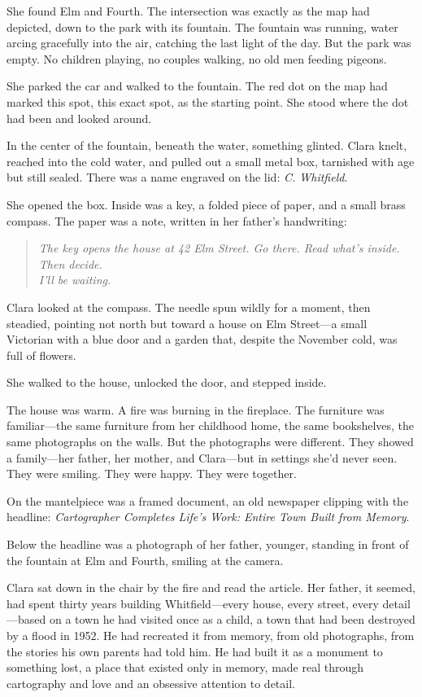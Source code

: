 \documentclass[
    language=english,
    doctype=short-story,
    institution=none,
]{../../omnilatex}
\begin{document}
She found Elm and Fourth. The intersection was exactly as the map had depicted, down to the park with its fountain. The fountain was running, water arcing gracefully into the air, catching the last light of the day. But the park was empty. No children playing, no couples walking, no old men feeding pigeons.

She parked the car and walked to the fountain. The red dot on the map had marked this spot, this exact spot, as the starting point. She stood where the dot had been and looked around.

In the center of the fountain, beneath the water, something glinted. Clara knelt, reached into the cold water, and pulled out a small metal box, tarnished with age but still sealed. There was a name engraved on the lid: \textit{C. Whitfield}.

She opened the box. Inside was a key, a folded piece of paper, and a small brass compass. The paper was a note, written in her father's handwriting:

\begin{quote}
\textit{The key opens the house at 42 Elm Street. Go there. Read what's inside. Then decide.}\\[0.3cm]
\textit{I'll be waiting.}
\end{quote}

Clara looked at the compass. The needle spun wildly for a moment, then steadied, pointing not north but toward a house on Elm Street---a small Victorian with a blue door and a garden that, despite the November cold, was full of flowers.

She walked to the house, unlocked the door, and stepped inside.

The house was warm. A fire was burning in the fireplace. The furniture was familiar---the same furniture from her childhood home, the same bookshelves, the same photographs on the walls. But the photographs were different. They showed a family---her father, her mother, and Clara---but in settings she'd never seen. They were smiling. They were happy. They were together.

On the mantelpiece was a framed document, an old newspaper clipping with the headline: \textit{Cartographer Completes Life's Work: Entire Town Built from Memory}.

Below the headline was a photograph of her father, younger, standing in front of the fountain at Elm and Fourth, smiling at the camera.

Clara sat down in the chair by the fire and read the article. Her father, it seemed, had spent thirty years building Whitfield---every house, every street, every detail---based on a town he had visited once as a child, a town that had been destroyed by a flood in 1952. He had recreated it from memory, from old photographs, from the stories his own parents had told him. He had built it as a monument to something lost, a place that existed only in memory, made real through cartography and love and an obsessive attention to detail.
\end{document}

